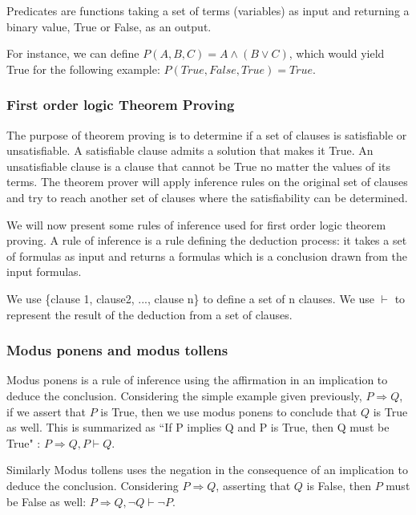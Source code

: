 Predicates are functions taking a set of terms (variables) as input and returning a binary value, True or False, as an output.

For instance, we can define $P(A,B,C) = A \wedge (B \vee C)$, which would yield True for the following example: $P(True,False,True)=True$.

\subsubsection{First order logic Theorem Proving}
The purpose of theorem proving is to determine if a set of clauses is satisfiable or unsatisfiable.
A satisfiable clause admits a solution that makes it True.
An unsatisfiable clause is a clause that cannot be True no matter the values of its terms.
The theorem prover will apply inference rules on the original set of clauses and try to reach another set of clauses where the satisfiability can be determined.

We will now present some rules of inference used for first order logic theorem proving.
A rule of inference is a rule defining the deduction process: it takes a set of formulas as input and returns a formulas which is a conclusion drawn from the input formulas. 

We use \{clause 1, clause2, ..., clause n\} to define a set of n clauses.
We use $\vdash$ to represent the result of the deduction from a set of clauses.

\subsubsection{Modus ponens and modus tollens}
Modus ponens is a rule of inference using the affirmation in an implication to deduce the conclusion.
Considering the simple example given previously, $P \Rightarrow Q$, if we assert that $P$ is True, then we use modus ponens to conclude that $Q$ is True as well. This is summarized as ``If P implies Q and P is True, then Q must be True" : $P \Rightarrow Q, P \vdash Q$.

Similarly Modus tollens uses the negation in the consequence of an implication to deduce the conclusion.
Considering $P \Rightarrow Q$, asserting that $Q$ is False, then $P$ must be False as well: $P \Rightarrow Q, \neg Q \vdash \neg P$.

